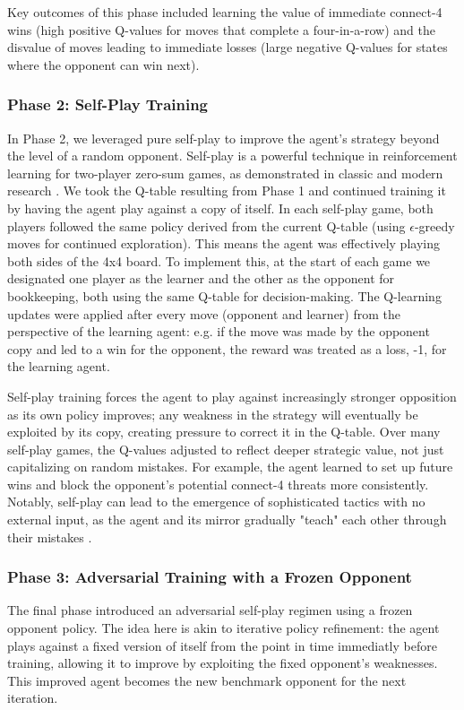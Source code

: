 \documentclass[10pt]{extarticle}
\begin{document}
Key outcomes of this phase included learning the value of immediate connect-4 wins (high positive Q-values for moves that complete a four-in-a-row) and the disvalue of moves leading to immediate losses (large negative Q-values for states where the opponent can win next).

\subsubsection{Phase 2: Self-Play Training}

In Phase 2, we leveraged pure self-play to improve the agent's strategy beyond the level of a random opponent. Self-play is a powerful technique in reinforcement learning for two-player zero-sum games, as demonstrated in classic and modern research \cite{Tesauro1995, Silver2018}. We took the Q-table resulting from Phase 1 and continued training it by having the agent play against a copy of itself. In each self-play game, both players followed the same policy derived from the current Q-table (using $\epsilon$-greedy moves for continued exploration). This means the agent was effectively playing both sides of the 4x4 board. To implement this, at the start of each game we designated one player as the learner and the other as the opponent for bookkeeping, both using the same Q-table for decision-making. The Q-learning updates were applied after every move (opponent and learner) from the perspective of the learning agent: e.g. if the move was made by the opponent copy and led to a win for the opponent, the reward was treated as a loss, -1, for the learning agent. 

Self-play training forces the agent to play against increasingly stronger opposition as its own policy improves; any weakness in the strategy will eventually be exploited by its copy, creating pressure to correct it in the Q-table. Over many self-play games, the Q-values adjusted to reflect deeper strategic value, not just capitalizing on random mistakes. For example, the agent learned to set up future wins and block the opponent's potential connect-4 threats more consistently. Notably, self-play can lead to the emergence of sophisticated tactics with no external input, as the agent and its mirror gradually "teach" each other through their mistakes \cite{Tesauro1995}.

\subsubsection{Phase 3: Adversarial Training with a Frozen Opponent}
The final phase introduced an adversarial self-play regimen using a frozen opponent policy. The idea here is akin to iterative policy refinement: the agent plays against a fixed version of itself from the point in time immediatly before training, allowing it to improve by exploiting the fixed opponent's weaknesses. This improved agent becomes the new benchmark opponent for the next iteration. 
\end{document}
